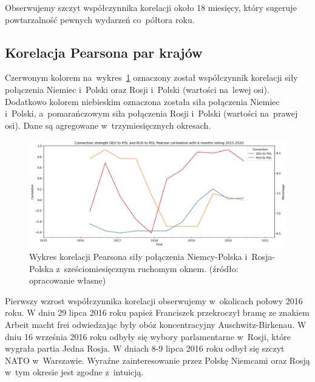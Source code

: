 \documentclass[11pt]{report}
\begin{document}
    Obserwujemy szczyt współczynnika korelacji około 18 miesięcy, który sugeruje powtarzalność pewnych wydarzeń co~półtora roku.

    \subsection{Korelacja Pearsona par krajów}
    Czerwonym kolorem na~wykres~\ref{fig:Connection strength DEU to POL and RUS to POL Pearson correlation with 6 months rolling 2015-2020}
    oznaczony został współczynnik korelacji siły połączenia Niemiec i~Polski oraz Rosji i~Polski (wartości na~lewej osi).
    Dodatkowo kolorem niebieskim oznaczona została siła połączenia Niemiec i~Polski, a~pomarańczowym siła połączenia Rosji i~Polski (wartości na~prawej osi).
    Dane są agregowane w~trzymiesięcznych okresach.

    \begin{figure}[!ht]
        \centering
        \includegraphics[width=\linewidth]{../spade_proto/figures/auto_seek/connection strength/pairwise_rolling_correlation/Connection strength DEU to POL and RUS to POL Pearson correlation with 6 months rolling 2015-2020.png}
        \caption{Wykres korelacji Pearsona siły połączenia Niemcy-Polska i~Rosja-Polska z~sześciomiesięcznym ruchomym oknem. (źródło: opracowanie własne)}
        \label{fig:Connection strength DEU to POL and RUS to POL Pearson correlation with 6 months rolling 2015-2020}
    \end{figure}

    Pierwszy wzrost współczynnika korelacji obserwujemy w~okolicach połowy 2016 roku.
    W dniu 29 lipca 2016 roku papież Franciszek przekroczył bramę ze znakiem Arbeit macht frei odwiedzając
    były obóz koncentracyjny Auschwitz-Birkenau.
    W dniu 16 września 2016 roku odbyły się wybory parlamentarne w~Rosji, które wygrała partia Jedna Rosja.
    W dniach 8-9 lipca 2016 roku odbył się szczyt NATO w~Warszawie.
    Wyraźne zainteresowanie przez Polskę Niemcami oraz Rosją w~tym okresie jest zgodne z~intuicją.
\end{document}
